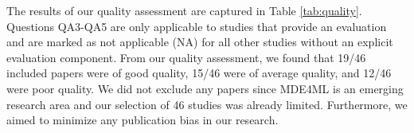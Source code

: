 The results of our quality assessment are captured in Table \ref{tab:quality}. Questions QA3-QA5 are only applicable to studies that provide an evaluation and are marked as not applicable (NA) for all other studies without an explicit evaluation component. From our quality assessment, we found that 19/46 included papers were of good quality, 15/46 were of average quality, and 12/46 were poor quality. We did not exclude any papers since MDE4ML is an emerging research area and our selection of 46 studies was already limited. Furthermore, we aimed to minimize any publication bias in our research.